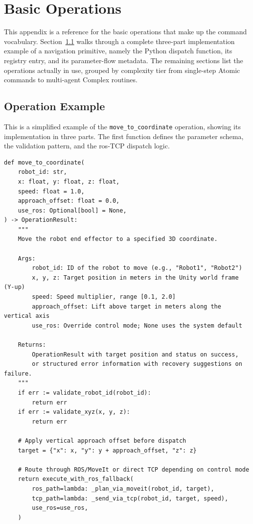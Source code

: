 \chapter{Basic Operations}\label{appendix:basic_ops}
This appendix is a reference for the basic operations that make up the command vocabulary. Section~\ref{appendix:operation_example} walks through a complete three-part implementation example of a navigation primitive, namely the Python dispatch function, its registry entry, and its parameter-flow metadata. The remaining sections list the operations actually in use, grouped by complexity tier from single-step Atomic commands to multi-agent Complex routines.

\section{Operation Example}\label{appendix:operation_example}
This is a simplified example of the \texttt{move\_to\_coordinate} operation, showing its implementation in three parts. The first function defines the parameter schema, the validation pattern, and the \gls{ros}-TCP dispatch logic.

\begin{lstlisting}[caption={Python implementation function for coordinate navigation with ROS fallback and validation guards.}, extendedchars=true]
def move_to_coordinate(
    robot_id: str,
    x: float, y: float, z: float,
    speed: float = 1.0,
    approach_offset: float = 0.0,
    use_ros: Optional[bool] = None,
) -> OperationResult:
    """
    Move the robot end effector to a specified 3D coordinate.

    Args:
        robot_id: ID of the robot to move (e.g., "Robot1", "Robot2")
        x, y, z: Target position in meters in the Unity world frame (Y-up)
        speed: Speed multiplier, range [0.1, 2.0]
        approach_offset: Lift above target in meters along the vertical axis
        use_ros: Override control mode; None uses the system default

    Returns:
        OperationResult with target position and status on success,
        or structured error information with recovery suggestions on failure.
    """
    if err := validate_robot_id(robot_id):
        return err
    if err := validate_xyz(x, y, z):
        return err

    # Apply vertical approach offset before dispatch
    target = {"x": x, "y": y + approach_offset, "z": z}

    # Route through ROS/MoveIt or direct TCP depending on control mode
    return execute_with_ros_fallback(
        ros_path=lambda: _plan_via_moveit(robot_id, target),
        tcp_path=lambda: _send_via_tcp(robot_id, target, speed),
        use_ros=use_ros,
    )
\end{lstlisting}

